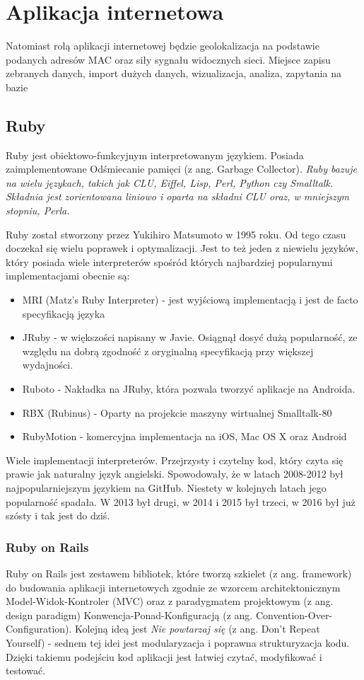 \section{Aplikacja internetowa}
Natomiast rolą aplikacji internetowej będzie geolokalizacja na podstawie podanych adresów MAC oraz siły sygnału widocznych sieci. Miejsce zapisu zebranych danych, import dużych danych, wizualizacja, analiza, zapytania na bazie

\subsection{Ruby}
Ruby jest obiektowo-funkcyjnym interpretowanym językiem. Posiada zaimplementowane Odśmiecanie pamięci (z ang. Garbage Collector). \textit{Ruby bazuje na wielu językach, takich jak CLU, Eiffel, Lisp, Perl, Python czy Smalltalk. Składnia jest zorientowana liniowo i oparta na składni CLU oraz, w mniejszym stopniu, Perla.}\cite{RubyWiki}

Ruby został stworzony przez Yukihiro Matsumoto w 1995 roku. Od tego czasu doczekał się wielu poprawek i optymalizacji. Jest to też jeden z niewielu języków, który posiada wiele interpreterów spośród których najbardziej popularnymi implementacjami obecnie są:
\begin{itemize}
    \item MRI (Matz's Ruby Interpreter) - jest wyjściową implementacją i jest de facto specyfikacją języka
    \item JRuby - w większości napisany w Javie. Osiągnął dosyć dużą popularność, ze względu na dobrą zgodność z oryginalną specyfikacją przy większej wydajności.
    \item Ruboto - Nakładka na JRuby, która pozwala tworzyć aplikacje na Androida.
    \item RBX (Rubinus) - Oparty na projekcie maszyny wirtualnej Smalltalk-80
    \item RubyMotion - komercyjna implementacja na iOS, Mac OS X oraz Android
\end{itemize}

Wiele implementacji interpreterów. Przejrzysty i czytelny kod, który czyta się prawie jak naturalny język angielski. Spowodowały, że w latach 2008-2012 był najpopularniejszym językiem na GitHub.\cite{RubyStats2015} Niestety w kolejnych latach jego popularność spadała. W 2013 był drugi, w 2014 i 2015 był trzeci\cite{RubyStats2015}, w 2016 był już szósty i tak jest do dziś.\cite{GithutStats2017}

\subsubsection{Ruby on Rails}
Ruby on Rails jest zestawem bibliotek, które tworzą szkielet (z ang. framework) do budowania aplikacji internetowych zgodnie ze wzorcem architektonicznym Model-Widok-Kontroler (MVC) oraz z paradygmatem projektowym (z ang. design paradigm) Konwencja-Ponad-Konfiguracją (z ang. Convention-Over-Configuration). Kolejną ideą jest \textit{Nie powtarzaj się} (z ang. Don't Repeat Yourself) - sednem tej idei jest modularyzacja i poprawna strukturyzacja kodu. Dzięki takiemu podejściu kod aplikacji jest łatwiej czytać, modyfikować i testować.

